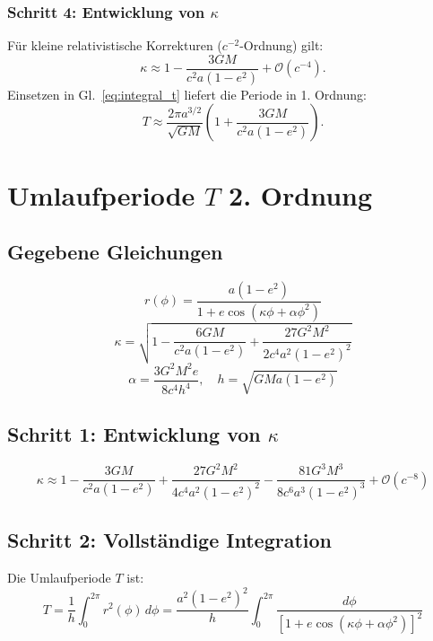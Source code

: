 \subsubsection*{Schritt 4: Entwicklung von $\kappa$}
Für kleine relativistische Korrekturen ($c^{-2}$-Ordnung) gilt:
\begin{equation}
    \kappa \approx 1 - \frac{3GM}{c^2 a(1-e^2)} + \mathcal{O}(c^{-4}).
\end{equation}
Einsetzen in Gl.~\eqref{eq:integral_t} liefert die Periode in 1. Ordnung:
\begin{equation}
    \boxed{
    T \approx \frac{2\pi a^{3/2}}{\sqrt{GM}} \left(1 + \frac{3GM}{c^2 a(1-e^2)}\right).
    }
\end{equation}

\newpage
\section{Umlaufperiode \( T \) 2. Ordnung}

\subsection*{Gegebene Gleichungen}
\begin{equation}
r(\phi) = \frac{a(1-e^2)}{1 + e\cos\left(\kappa\phi + \alpha\phi^2\right)}
\end{equation}
\begin{equation}
\kappa = \sqrt{1 - \frac{6GM}{c^2a(1-e^2)} + \frac{27G^2M^2}{2c^4a^2(1-e^2)^2}}
\end{equation}
\begin{equation}
\alpha = \frac{3G^2M^2e}{8c^4h^4}, \quad h = \sqrt{GMa(1-e^2)}
\end{equation}

\subsection*{Schritt 1: Entwicklung von \(\kappa\)}
\begin{equation}
\kappa \approx 1 - \frac{3GM}{c^2a(1-e^2)} + \frac{27G^2M^2}{4c^4a^2(1-e^2)^2} - \frac{81G^3M^3}{8c^6a^3(1-e^2)^3} + \mathcal{O}(c^{-8}) 
\end{equation}

\subsection*{Schritt 2: Vollständige Integration}
Die Umlaufperiode \( T \) ist:
\begin{equation}
T = \frac{1}{h} \int_0^{2\pi} r^2(\phi) \, d\phi = \frac{a^2(1-e^2)^2}{h} \int_0^{2\pi} \frac{d\phi}{\left[1 + e\cos\left(\kappa\phi + \alpha\phi^2\right)\right]^2}
\end{equation}

